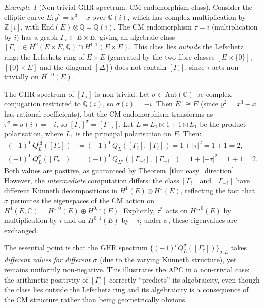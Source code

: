 \documentclass[aps,prd,twocolumn,superscriptaddress,nofootinbib]{revtex4-2}
\theoremstyle{definition}
\theoremstyle{remark}
\newtheorem{example}[theorem]{Example}
\begin{document}
\begin{example}[Non-trivial GHR spectrum: CM endomorphism class]
\label{ex:cm_endomorphism}
Consider the elliptic curve $E: y^2 = x^3 - x$ over $\mathbb{Q}(i)$, which has complex multiplication by $\mathbb{Z}[i]$, with $\mathrm{End}(E) \otimes \mathbb{Q} = \mathbb{Q}(i)$. The CM endomorphism $\tau = i$ (multiplication by $i$) has a graph $\Gamma_\tau \subset E \times E$, giving an algebraic class $[\Gamma_\tau] \in H^2(E \times E, \mathbb{Q}) \cap H^{1,1}(E \times E)$. This class lies \emph{outside} the Lefschetz ring: the Lefschetz ring of $E \times E$ (generated by the two fibre classes $[E \times \{0\}]$, $[\{0\} \times E]$ and the diagonal $[\Delta]$) does not contain $[\Gamma_\tau]$, since $\tau$ acts non-trivially on $H^{1,0}(E)$.

The GHR spectrum of $[\Gamma_\tau]$ is non-trivial. Let $\sigma \in \mathrm{Aut}(\mathbb{C})$ be complex conjugation restricted to $\mathbb{Q}(i)$, so $\sigma(i) = -i$. Then $E^\sigma \cong E$ (since $y^2 = x^3 - x$ has rational coefficients), but the CM endomorphism transforms as $\tau^\sigma = \sigma(i) = -i$, so $[\Gamma_\tau]^\sigma = [\Gamma_{-\tau}]$. Let $L = L_1 \boxtimes 1 + 1 \boxtimes L_1$ be the product polarisation, where $L_1$ is the principal polarisation on $E$. Then:
\begin{align}
(-1)^1\, Q_L^\mathrm{id}([\Gamma_\tau]) &= (-1)^1\, Q_L([\Gamma_i],\, [\Gamma_i]) = 1 + |\tau|^2 = 1 + 1 = 2, \label{eq:cm_id}\\
(-1)^1\, Q_L^\sigma([\Gamma_\tau]) &= (-1)^1\, Q_{L^\sigma}([\Gamma_{-i}],\, [\Gamma_{-i}]) = 1 + |-\tau|^2 = 1 + 1 = 2. \label{eq:cm_sigma}
\end{align}
Both values are positive, as guaranteed by Theorem~\ref{thm:easy_direction}. However, the \emph{intermediate} computation differs: the class $[\Gamma_i]$ and $[\Gamma_{-i}]$ have different K\"unneth decompositions in $H^1(E) \otimes H^1(E)$, reflecting the fact that $\sigma$ permutes the eigenspaces of the CM action on $H^1(E, \mathbb{C}) = H^{1,0}(E) \oplus H^{0,1}(E)$. Explicitly, $\tau^*$ acts on $H^{1,0}(E)$ by multiplication by $i$ and on $H^{0,1}(E)$ by $-i$; under $\sigma$, these eigenvalues are exchanged.

The essential point is that the GHR spectrum $\{(-1)^p Q_L^\sigma([\Gamma_\tau])\}_{\sigma, L}$ takes \emph{different values for different $\sigma$} (due to the varying K\"unneth structure), yet remains uniformly non-negative. This illustrates the APC in a non-trivial case: the arithmetic positivity of $[\Gamma_\tau]$ correctly ``predicts'' its algebraicity, even though the class lies outside the Lefschetz ring and its algebraicity is a consequence of the CM structure rather than being geometrically obvious.
\end{example}
\end{document}
